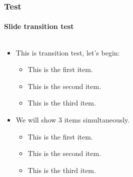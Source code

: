 \documentclass[aspectratio=169,hyperref={implicit=true}]{beamer}
\begin{document}
\begin{frame}

\frametitle{Test}
\framesubtitle{Slide transition test}
\label{sec:slidetrans}

\begin{columns}
  \begin{column}{.48\textwidth}
    \begin{itemize}
      \item<1-> This is transition test, let's begin:
      \begin{itemize}
        \item<2-> This is the first item.
        \item<3-> This is the second item.
        \item<4-> This is the third item.
      \end{itemize}
      \item<5-> We will show 3 items simultaneously.
      \begin{itemize}
        \item<6-> This is the first item.
        \item<6-> This is the second item.
        \item<6-> This is the third item.
      \end{itemize}
    \end{itemize}
  \end{column}
  \begin{column}{.48\textwidth}
  \end{column}
\end{columns}

\end{frame}

\ThankYouFrame
\end{document}
